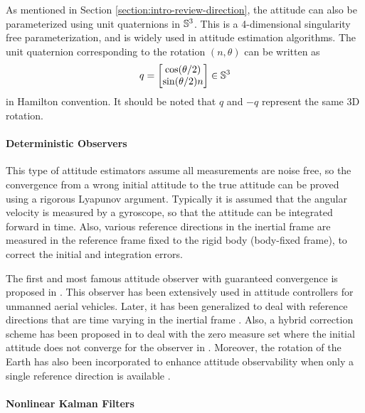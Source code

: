 As mentioned in Section \ref{section:intro-review-direction}, the attitude can also be parameterized using unit quaternions in $\mathbb{S}^3$.
This is a 4-dimensional singularity free parameterization, and is widely used in attitude estimation algorithms.
The unit quaternion corresponding to the rotation $(n,\theta)$ can be written as
\begin{align} \label{eqn:rv2qua}
	q = \begin{bmatrix} \cos(\theta/2) \\ \sin(\theta/2) n \end{bmatrix} \in \mathbb{S}^3
\end{align}
in Hamilton convention.
It should be noted that $q$ and $-q$ represent the same 3D rotation.

\paragraph{Deterministic Observers}

This type of attitude estimators assume all measurements are noise free, so the convergence from a wrong initial attitude to the true attitude can be proved using a rigorous Lyapunov argument.
Typically it is assumed that the angular velocity is measured by a gyroscope, so that the attitude can be integrated forward in time.
Also, various reference directions in the inertial frame are measured in the reference frame fixed to the rigid body (body-fixed frame), to correct the initial and integration errors.

The first and most famous attitude observer with guaranteed convergence is proposed in \cite{mahony2008nonlinear}.
This observer has been extensively used in attitude controllers for unmanned aerial vehicles.
Later, it has been generalized to deal with reference directions that are time varying in the inertial frame \cite{batista2012ges,grip2011attitude,trumpf2012analysis}.
Also, a hybrid correction scheme has been proposed in \cite{wu2015globally} to deal with the zero measure set where the initial attitude does not converge for the observer in \cite{mahony2008nonlinear}.
Moreover, the rotation of the Earth has also been incorporated to enhance attitude observability when only a single reference direction is available \cite{reis2018nonlinear}.

\paragraph{Nonlinear Kalman Filters}

